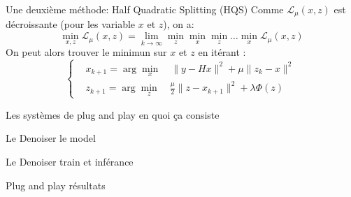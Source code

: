\documentclass[11pt]{beamer}
\begin{document}
\begin{frame}{Une deuxième méthode: Half Quadratic Splitting (HQS)}
    Comme $\mathcal{L}_{\mu}(x,z)$ est décroissante (pour les variable $x$ et $z$), on a:
    $$\min_{x, z} \mathcal{L}_{\mu}(x,z) = \lim_{k \rightarrow \infty} \min_z \min_x \min_z \dots \min_x \mathcal{L}_{\mu}(x,z)$$
    On peut alors trouver le minimun sur $x$ et $z$ en itérant :
    \begin{equation*}
        \left\{
        \begin{aligned}
            & x_{k+1} = \arg \min_x \quad \lVert y - Hx \rVert^2 + \mu \lVert z_k - x \rVert^2 \\
            & z_{k+1} = \arg \min_z \quad \frac{\mu}{2}\lVert z - x_{k+1} \rVert^2 + \lambda \Phi(z)
        \end{aligned}
        \right.
    \end{equation*}
\end{frame}


\begin{frame}{Les systèmes de plug and play}
    en quoi ça consiste
\end{frame}

\begin{frame}{Le Denoiser}
    le model
\end{frame}

\begin{frame}{Le Denoiser}
    train et inférance
\end{frame}

\begin{frame}{Plug and play}
    résultats
\end{frame}
\end{document}
